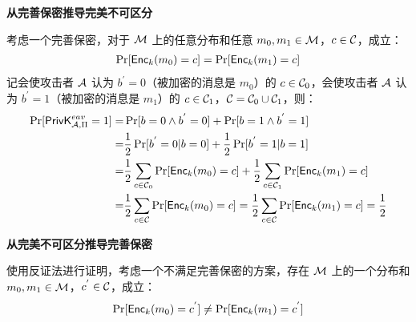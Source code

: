 \begin{questions}
        \begin{solution}
            \newline
            \begin{large}
                \textbf{从完善保密推导完美不可区分}
            \end{large}
            \newline
            考虑一个完善保密，对于 $\mathcal{M}$ 上的任意分布和任意 $m_0,m_1\in\mathcal{M}$，$c\in\mathcal{C}$，成立：
            \begin{equation}
                \begin{aligned}
                    \Pr[\mathsf{Enc}_k(m_0)=c]=\Pr[\mathsf{Enc}_k(m_1)=c]
                \end{aligned}
            \end{equation}
            记会使攻击者 $\mathcal{A}$ 认为 $b^{'}=0$（被加密的消息是 $m_0$）的 $c\in\mathcal{C}_0$，会使攻击者 $\mathcal{A}$ 认为 $b^{'}=1$（被加密的消息是 $m_1$）的 $c\in\mathcal{C}_1$，$\mathcal{C}=\mathcal{C}_0\cup\mathcal{C}_1$，则：
            \begin{equation}
                \begin{aligned}
                    \Pr[\mathsf{PrivK}^{eav}_{\mathcal{A},\Pi}=1]=&\Pr[b=0\wedge{b}^{'}=0]+\Pr[b=1\wedge{b}^{'}=1]\\
                    =&\frac{1}{2}\Pr[{b}^{'}=0|b=0]+\frac{1}{2}\Pr[{b}^{'}=1|b=1]\\
                    =&\frac{1}{2}\sum_{c\in\mathcal{C}_0}\Pr[\mathsf{Enc}_k(m_0)=c]+\frac{1}{2}\sum_{c\in\mathcal{C}_1}\Pr[\mathsf{Enc}_k(m_1)=c]\\
                    =&\frac{1}{2}\sum_{c\in\mathcal{C}}\Pr[\mathsf{Enc}_k(m_0)=c]=\frac{1}{2}\sum_{c\in\mathcal{C}}\Pr[\mathsf{Enc}_k(m_1)=c]=\frac{1}{2}
                \end{aligned}
            \end{equation}
            \newline
            \begin{large}
                \textbf{从完美不可区分推导完善保密}
            \end{large}
            \newline
            使用反证法进行证明，考虑一个不满足完善保密的方案，存在 $\mathcal{M}$ 上的一个分布和 $m_0,m_1\in\mathcal{M}$，$c^{'}\in\mathcal{C}$，成立：
            \begin{equation}
                \begin{aligned}
                    \Pr[\skcenc_k(m_0)=c^{'}]\neq\Pr[\skcenc_k(m_1)=c^{'}]
                \end{aligned}

\end{equation}
\end{solution}
\end{questions}
